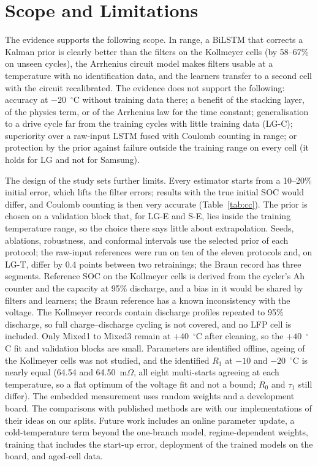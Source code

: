 \documentclass[journal]{IEEEtran}
\begin{document}
\section{Scope and Limitations}
The evidence supports the following scope. In range, a BiLSTM that corrects a Kalman prior is clearly better than the filters on the Kollmeyer cells (by 58--67\% on unseen cycles), the Arrhenius circuit model makes filters usable at a temperature with no identification data, and the learners transfer to a second cell with the circuit recalibrated. The evidence does not support the following: accuracy at $-20$~$^\circ$C without training data there; a benefit of the stacking layer, of the physics term, or of the Arrhenius law for the time constant; generalisation to a drive cycle far from the training cycles with little training data (LG-C); superiority over a raw-input LSTM fused with Coulomb counting in range; or protection by the prior against failure outside the training range on every cell (it holds for LG and not for Samsung).

The design of the study sets further limits. Every estimator starts from a 10--20\% initial error, which lifts the filter errors; results with the true initial SOC would differ, and Coulomb counting is then very accurate (Table~\ref{tab:cc}). The prior is chosen on a validation block that, for LG-E and S-E, lies inside the training temperature range, so the choice there says little about extrapolation. Seeds, ablations, robustness, and conformal intervals use the selected prior of each protocol; the raw-input references were run on ten of the eleven protocols and, on LG-T, differ by 0.4 points between two retrainings; the Braun record has three segments. Reference SOC on the Kollmeyer cells is derived from the cycler's Ah counter and the capacity at 95\% discharge, and a bias in it would be shared by filters and learners; the Braun reference has a known inconsistency with the voltage. The Kollmeyer records contain discharge profiles repeated to 95\% discharge, so full charge--discharge cycling is not covered, and no LFP cell is included. Only Mixed1 to Mixed3 remain at $+40$~$^\circ$C after cleaning, so the $+40$~$^\circ$C fit and validation blocks are small. Parameters are identified offline, ageing of the Kollmeyer cells was not studied, and the identified $R_1$ at $-10$ and $-20$~$^\circ$C is nearly equal (64.54 and 64.50~m$\Omega$, all eight multi-starts agreeing at each temperature, so a flat optimum of the voltage fit and not a bound; $R_0$ and $\tau_1$ still differ). The embedded measurement uses random weights and a development board. The comparisons with published methods are with our implementations of their ideas on our splits. Future work includes an online parameter update, a cold-temperature term beyond the one-branch model, regime-dependent weights, training that includes the start-up error, deployment of the trained models on the board, and aged-cell data.
\end{document}
